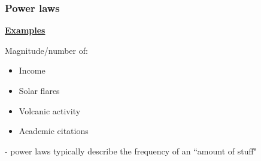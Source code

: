 \documentclass[t,8pt]{beamer}%
\begin{document}

\begin{frame}
	\frametitle{Power laws}
	{\bf\underline{Examples}} \par
	Magnitude/number of: 
	\begin{itemize}
		\item Income
		\item Solar flares
		\item Volcanic activity
		\item Academic citations
	\end{itemize}
	{\small\color{NavyBlue} - power laws typically describe the frequency of an ``amount of stuff"} \par
\end{frame}
\end{document}
